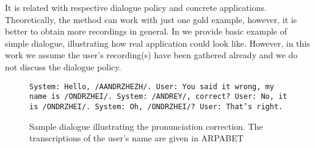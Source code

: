 It is related with respective dialogue policy and concrete applications.
Theoretically, the method can work with just one gold example, however, it is better to obtain more recordings in general.
In  we provide basic example of simple dialogue, illustrating how real application could look like.
However, in this work we assume the user's recording(s) have been gathered already and we do not discuss the dialogue policy.
\begin{center}
\begin{figure}[h]
\texttt{System: Hello, /AANDRZHEZH/.\linebreak
User: You said it wrong, my name is /ONDRZHEI/.\linebreak
System: /ANDREY/, correct?\linebreak
User: No, it is /ONDRZHEI/.\linebreak
System: Oh, /ONDRZHEI/?\linebreak
User: That's right.
}
\caption{Sample dialogue illustrating the pronunciation correction. The transcriptions of the user's name are given in ARPABET\citep{Arpabet}}
\label{dialogsample}
\end{figure}
\end{center}
